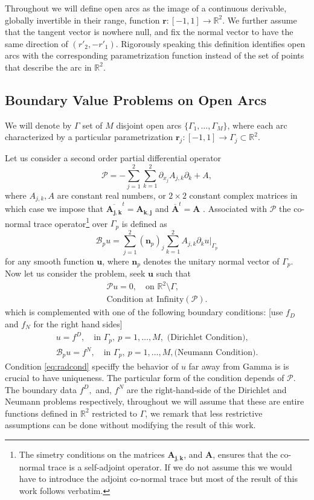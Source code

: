 \documentclass{article}
\newcommand{\todo}[1]{{\color{red}[#1]}}
\newcommand{\cB}{\mathcal B}
\newcommand{\IR}{{\mathbb R}}
\newcommand{\cP}{\mathcal{P}}
\newcommand{\bn}{\bm{n}}
\newcommand{\bu}{\bm{u}}
\newcommand{\br}{\bm{r}}
\begin{document}
Throughout we will define open arcs as the image of a continuous derivable, globally invertible in their range, function $\br : [-1,1] \rightarrow \IR^2$.  We further assume that the tangent vector is nowhere null, and fix the normal vector to have the same direction of $(r'_2,-r'_1)$. Rigorously speaking  this definition identifies open arcs with the corresponding parametrization function instead of the set of points that describe the arc in $\IR^2$. 
\subsection{Boundary Value Problems on Open Arcs}
\label{sec:bvproblem}
We will denote by $\Gamma$ set of $M$ disjoint open arcs $ \{ \Gamma_1, \hdots, \Gamma_M\}$, where  each arc characterized by a particular parametrization $\br_j :[-1,1] \rightarrow \Gamma_j \subset \IR^2$.

Let us consider a second order partial differential operator 
$$\cP = - \sum_{j=1}^2 \sum_{k=1}^2 \partial_{x_j}{A_{j,k}} \partial_k  + {A},$$
where ${A_{j,k}},{A}$ are constant real numbers, or $2\times 2$ constant complex matrices in which case we impose that $\overline{\mathbf{A_{j,k}}}^t = \mathbf{A_{k,j}}$ and $\overline{\mathbf{A}}^t = \mathbf{A}$ . Associated with $\cP$ the co-normal trace operator\footnote{The simetry conditions on the matrices $\mathbf{A_{j,k}}$, and $\mathbf{A}$, ensures that the co-normal trace is a self-adjoint operator. If we do not assume this we would have to introduce the adjoint co-normal trace but most of the result of this work follows verbatim.} over $\Gamma_p$ is defined as 
$$
\cB_p u =  \sum_{j=1}^2 (\bn_p)_j \sum_{k=1}^2 {A}_{j,k} \partial_k u \vert_{\Gamma_p} 
$$
for any smooth function $\bu$, where $\bn_p$ denotes the unitary normal vector of $\Gamma_p$. Now let us consider the problem, seek $\bu$ such that 
\begin{align}
\label{eq:volprob}
\cP u = 0, \quad \text{on } \IR^2 \setminus \Gamma,\\
\label{eq:radcond}
\text{Condition at Infinity}(\cP). 
\end{align}
which is complemented with one of the following boundary conditions:  \todo{use $f_D$ and $f_N$ for the right hand sides}
\begin{align}
\label{eq:dircond}
u = f^D,   \quad \text{in } \Gamma_p, \ p =1,\hdots,M,  \text{ (Dirichlet Condition)},\\
\label{eq:neumanncond}
 \cB_p u = f^N,  \quad \text{in } \Gamma_p, \ p =1,\hdots,M,  \text{(Neumann Condition)}.
\end{align}
Condition \eqref{eq:radcond} speciffy the behavior of $u$ far away from Gamma is is crucial to have uniqueness. The particular form of the condition depends of $\cP$. The boundary data $f^D,$ and, $f^N$ are the right-hand-side of the Dirichlet and Neumann problems respectively, throughout we will assume that these are entire functions defined in $\IR^2$ restricted to $\Gamma$, we remark that less restrictive assumptions can be done without modifying the result of this work.
\end{document}
